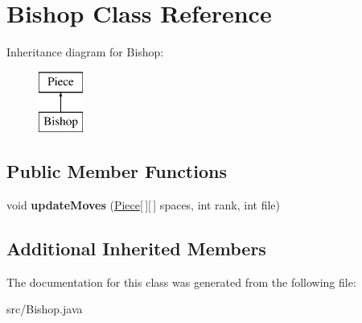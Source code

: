 \hypertarget{class_bishop}{\section{Bishop Class Reference}
\label{class_bishop}
}
Inheritance diagram for Bishop\-:\begin{figure}[H]
\begin{center}
\leavevmode
\includegraphics[height=2.000000cm]{class_bishop}
\end{center}
\end{figure}
\subsection*{Public Member Functions}
\begin{DoxyCompactItemize}
\item 
\hypertarget{class_bishop_acab26f3bb2c1de313918ada7efb8e0d3}{void {\bfseries update\-Moves} (\hyperlink{class_piece}{Piece}\mbox{[}$\,$\mbox{]}\mbox{[}$\,$\mbox{]} spaces, int rank, int file)}\label{class_bishop_acab26f3bb2c1de313918ada7efb8e0d3}

\end{DoxyCompactItemize}
\subsection*{Additional Inherited Members}


The documentation for this class was generated from the following file\-:\begin{DoxyCompactItemize}
\item 
src/Bishop.\-java\end{DoxyCompactItemize}
